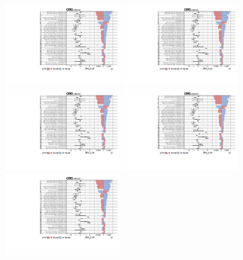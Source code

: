 \begin{figure}[htbp]
  \centering
  \includegraphics[width=0.45\textwidth,page=1]{fig/fitValidation/impacts_WprToWH1000_6p_72.pdf}
  \includegraphics[width=0.45\textwidth,page=2]{fig/fitValidation/impacts_WprToWH1000_6p_72.pdf}\\
  \includegraphics[width=0.45\textwidth,page=3]{fig/fitValidation/impacts_WprToWH1000_6p_72.pdf}
  \includegraphics[width=0.45\textwidth,page=4]{fig/fitValidation/impacts_WprToWH1000_6p_72.pdf}\\
  \includegraphics[width=0.45\textwidth,page=5]{fig/fitValidation/impacts_WprToWH1000_6p_72.pdf}

\end{figure}
